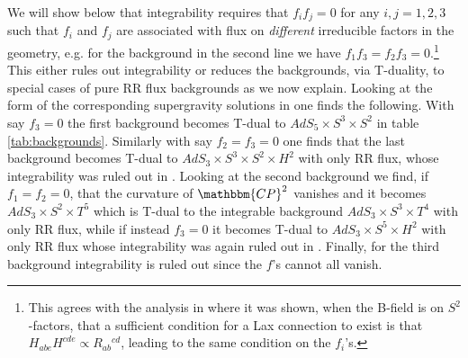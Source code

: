 \documentclass[a4paper,11pt]{article}
\begin{document}
We will show below that integrability requires that $f_if_j=0$ for any $i,j=1,2,3$ such that $f_i$ and $f_j$ are associated with flux on \emph{different} irreducible factors in the geometry, e.g. for the background in the second line we have $f_1f_3=f_2f_3=0$.\footnote{This agrees with the analysis in \cite{Wulff:2015mwa} where it was shown, when the B-field is on $S^2$-factors, that a sufficient condition for a Lax connection to exist is that $H_{abe}H^{cde}\propto R_{ab}{}^{cd}$, leading to the same condition on the $f_i$'s.} This either rules out integrability or reduces the backgrounds, via T-duality, to special cases of pure RR flux backgrounds as we now explain. Looking at the form of the corresponding supergravity solutions in \cite{Wulff:2017zbl} one finds the following. With say $f_3=0$ the first background becomes T-dual to $AdS_5\times S^3\times S^2$ in table \ref{tab:backgrounds}. Similarly with say $f_2=f_3=0$ one finds that the last background becomes T-dual to $AdS_3\times S^3\times S^2\times H^2$ with only RR flux, whose integrability was ruled out in \cite{Wulff:2017lxh}. Looking at the second background we find, if $f_1=f_2=0$, that the curvature of $\mathbbm{CP}^2$ vanishes and it becomes $AdS_3\times S^2\times T^5$ which is T-dual to the integrable background $AdS_3\times S^3\times T^4$ with only RR flux, while if instead $f_3=0$ it becomes T-dual to $AdS_3\times S^5\times H^2$ with only RR flux whose integrability was again ruled out in \cite{Wulff:2017lxh}. Finally, for the third background integrability is ruled out since the $f$'s cannot all vanish.
\end{document}

